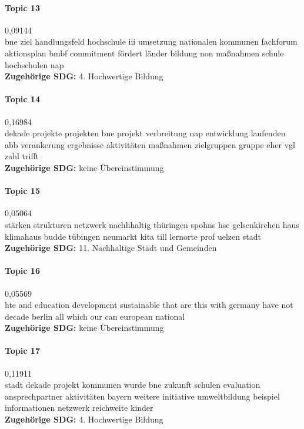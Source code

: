 \documentclass[a4paper,11pt]{article}
\begin{document}
\paragraph{Topic 13} 0,09144 \\
bne ziel handlungsfeld hochschule iii umsetzung nationalen kommunen fachforum
aktionsplan bmbf commitment fördert länder bildung non maßnahmen schule
hochschulen nap    \\ 
\textbf{Zugehörige SDG:} 4. Hochwertige Bildung 

\paragraph{Topic 14} 0,16984 \\
dekade projekte projekten bne projekt verbreitung nap entwicklung laufenden
abb verankerung ergebnisse aktivitäten maßnahmen zielgruppen gruppe eher vgl
zahl trifft    \\ 
\textbf{Zugehörige SDG:} keine Übereinstimmung 
    
\paragraph{Topic 15} 0,05064 \\
stärken strukturen netzwerk nachhhaltig thüringen spohns hsc gelsenkirchen
haus klimahaus budde tübingen neumarkt kita till lernorte prof uelzen stadt  \\
\textbf{Zugehörige SDG:} 11. Nachhaltige Städt und Gemeinden 
    
\paragraph{Topic 16} 0,05569 \\
hte and education development sustainable that are this with germany have not
decade berlin all which our can european national\\ 
\textbf{Zugehörige SDG:} keine Übereinstimmung 

\paragraph{Topic 17} 0,11911\\
stadt dekade projekt kommunen wurde bne zukunft schulen evaluation
ansprechpartner aktivitäten bayern weitere initiative umweltbildung beispiel
informationen netzwerk reichweite kinder    \\ 
\textbf{Zugehörige SDG:} 4. Hochwertige Bildung
\end{document}
